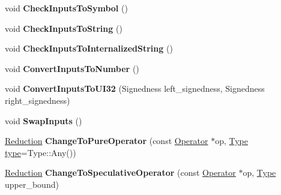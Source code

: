 \begin{DoxyCompactItemize}
void {\bfseries Check\+Inputs\+To\+Symbol} ()
\item 
\mbox{\label{classv8_1_1internal_1_1compiler_1_1JSBinopReduction_ac28667cf6ee25d15924981e3d61c02e0}} 
void {\bfseries Check\+Inputs\+To\+String} ()
\item 
\mbox{\label{classv8_1_1internal_1_1compiler_1_1JSBinopReduction_a873317789de542c0720c50db21fa29c6}} 
void {\bfseries Check\+Inputs\+To\+Internalized\+String} ()
\item 
\mbox{\label{classv8_1_1internal_1_1compiler_1_1JSBinopReduction_a0c3edbdd8c46761d38a05b8cd3ff5821}} 
void {\bfseries Convert\+Inputs\+To\+Number} ()
\item 
\mbox{\label{classv8_1_1internal_1_1compiler_1_1JSBinopReduction_a324487f05e21c0cbf8deade5d02d2323}} 
void {\bfseries Convert\+Inputs\+To\+U\+I32} (Signedness left\+\_\+signedness, Signedness right\+\_\+signedness)
\item 
\mbox{\label{classv8_1_1internal_1_1compiler_1_1JSBinopReduction_a8a83369e484a9816711b052b914d2b75}} 
void {\bfseries Swap\+Inputs} ()
\item 
\mbox{\label{classv8_1_1internal_1_1compiler_1_1JSBinopReduction_a81e03e45cb57468ce5d7e9eb6b9b97c6}} 
\mbox{\hyperlink{classv8_1_1internal_1_1compiler_1_1Reduction}{Reduction}} {\bfseries Change\+To\+Pure\+Operator} (const \mbox{\hyperlink{classv8_1_1internal_1_1compiler_1_1Operator}{Operator}} $\ast$op, \mbox{\hyperlink{classv8_1_1internal_1_1compiler_1_1Type}{Type}} \mbox{\hyperlink{classstd_1_1conditional_1_1type}{type}}=Type\+::\+Any())
\item 
\mbox{\label{classv8_1_1internal_1_1compiler_1_1JSBinopReduction_a8e1e048a0552ce7888af0bbf36f60c38}} 
\mbox{\hyperlink{classv8_1_1internal_1_1compiler_1_1Reduction}{Reduction}} {\bfseries Change\+To\+Speculative\+Operator} (const \mbox{\hyperlink{classv8_1_1internal_1_1compiler_1_1Operator}{Operator}} $\ast$op, \mbox{\hyperlink{classv8_1_1internal_1_1compiler_1_1Type}{Type}} upper\+\_\+bound)

\end{DoxyCompactItemize}
